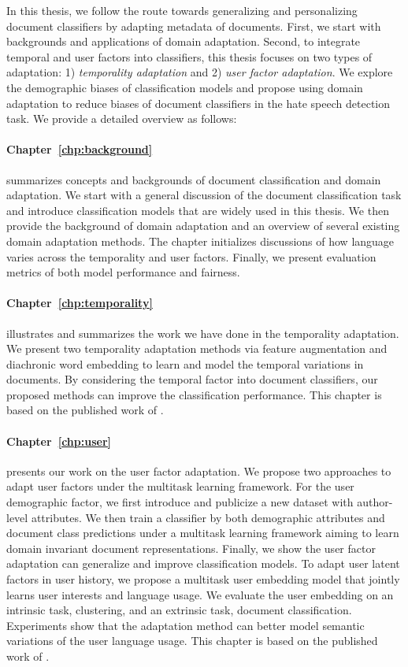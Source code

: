 In this thesis, we follow the route towards generalizing and personalizing document classifiers by adapting metadata of documents.
First, we start with backgrounds and applications of domain adaptation.
Second, to integrate temporal and user factors into classifiers, this thesis focuses on two types of adaptation: 1) \textit{temporality adaptation} and 2) \textit{user factor adaptation}.
We explore the demographic biases of classification models and propose using domain adaptation to reduce biases of document classifiers in the hate speech detection task.
We provide a detailed overview as follows:

\paragraph{Chapter~\ref{chp:background}} summarizes concepts and backgrounds of document classification and domain adaptation. We start with a general discussion of the document classification task and introduce classification models that are widely used in this thesis. We then provide the background of domain adaptation and an overview of several existing domain adaptation methods. The chapter initializes discussions of how language varies across the temporality and user factors. Finally, we present evaluation metrics of both model performance and fairness.

\paragraph{Chapter~\ref{chp:temporality}} illustrates and summarizes the work we have done in the temporality adaptation. We present two temporality adaptation methods via feature augmentation and diachronic word embedding to learn and model the temporal variations in documents. By considering the temporal factor into document classifiers, our proposed methods can improve the classification performance. This chapter is based on the published work of \cite{huang2018examining, huang2019neural}.

\paragraph{Chapter~\ref{chp:user}} presents our work on the user factor adaptation. We propose two approaches to adapt user factors under the multitask learning framework. For the user demographic factor, we first introduce and publicize a new dataset with author-level attributes. We then train a classifier by both demographic attributes and document class predictions under a multitask learning framework aiming to learn domain invariant document representations. Finally, we show the user factor adaptation can generalize and improve classification models. To adapt user latent factors in user history, we propose a multitask user embedding model that jointly learns user interests and language usage. We evaluate the user embedding on an intrinsic task, clustering, and an extrinsic task, document classification. Experiments show that the adaptation method can better model semantic variations of the user language usage. This chapter is based on the published work of \cite{huang2019neuraluser, huang2020user}.

